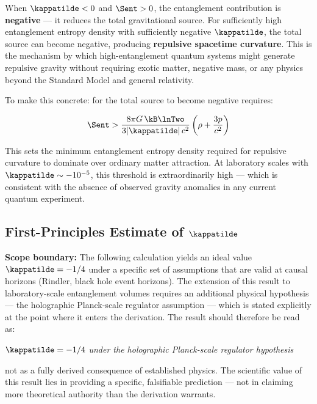 \noindent When $\kappatilde < 0$ and $\Sent > 0$, the entanglement
contribution is \textbf{negative} --- it reduces the total gravitational
source. For sufficiently high entanglement entropy density with sufficiently
negative $\kappatilde$, the total source can become negative, producing
\textbf{repulsive spacetime curvature}. This is the mechanism by which
high-entanglement quantum systems might generate repulsive gravity without
requiring exotic matter, negative mass, or any physics beyond the Standard
Model and general relativity.

To make this concrete: for the total source to become negative requires:

\begin{equation}
    \Sent > \frac{8\pi G\,\kB\lnTwo}{3|\kappatilde|\,c^2}
    \left(\rho + \frac{3p}{c^2}\right)
    \label{eq:repulsion_threshold}
\end{equation}

This sets the minimum entanglement entropy density required for repulsive
curvature to dominate over ordinary matter attraction. At laboratory scales
with $\kappatilde \sim -10^{-5}$, this threshold is extraordinarily high ---
which is consistent with the absence of observed gravity anomalies in any
current quantum experiment.

\subsection{First-Principles Estimate of $\kappatilde$}
\label{subsec:kappa_derivation}

\begin{framed}
\noindent\textbf{Scope boundary:} The following calculation yields an ideal
value $\kappatilde = -1/4$ under a specific set of assumptions that are
valid at causal horizons (Rindler, black hole event horizons). The extension
of this result to laboratory-scale entanglement volumes requires an additional
physical hypothesis --- the holographic Planck-scale regulator assumption ---
which is stated explicitly at the point where it enters the derivation. The
result should therefore be read as:

\begin{center}
$\kappatilde = -1/4$ \emph{under the holographic Planck-scale regulator
hypothesis}
\end{center}

\noindent not as a fully derived consequence of established physics.
The scientific value of this result lies in providing a specific,
falsifiable prediction --- not in claiming more theoretical authority
than the derivation warrants.
\end{framed}

